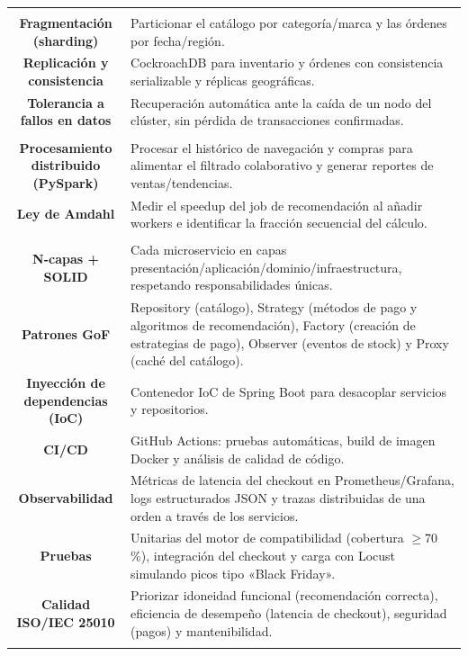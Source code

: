 \documentclass[11pt]{article}
\begin{document}
\begin{longtable}{C A}
\\
\textbf{Fragmentación (sharding)} & Particionar el catálogo por categoría/marca y las órdenes por fecha/región.\\
\textbf{Replicación y consistencia} & CockroachDB para inventario y órdenes con consistencia serializable y réplicas geográficas.\\
\textbf{Tolerancia a fallos en datos} & Recuperación automática ante la caída de un nodo del clúster, sin pérdida de transacciones confirmadas.\\
\addlinespace[1pt]
\\
\textbf{Procesamiento distribuido (PySpark)} & Procesar el histórico de navegación y compras para alimentar el filtrado colaborativo y generar reportes de ventas/tendencias.\\
\textbf{Ley de Amdahl} & Medir el speedup del job de recomendación al añadir workers e identificar la fracción secuencial del cálculo.\\
\addlinespace[1pt]
\\
\textbf{N-capas + SOLID} & Cada microservicio en capas presentación/aplicación/dominio/infraestructura, respetando responsabilidades únicas.\\
\textbf{Patrones GoF} & Repository (catálogo), Strategy (métodos de pago y algoritmos de recomendación), Factory (creación de estrategias de pago), Observer (eventos de stock) y Proxy (caché del catálogo).\\
\textbf{Inyección de dependencias (IoC)} & Contenedor IoC de Spring Boot para desacoplar servicios y repositorios.\\
\textbf{CI/CD} & GitHub Actions: pruebas automáticas, build de imagen Docker y análisis de calidad de código.\\
\textbf{Observabilidad} & Métricas de latencia del checkout en Prometheus/Grafana, logs estructurados JSON y trazas distribuidas de una orden a través de los servicios.\\
\textbf{Pruebas} & Unitarias del motor de compatibilidad (cobertura $\geq$70 \%), integración del checkout y carga con Locust simulando picos tipo «Black Friday».\\
\textbf{Calidad ISO/IEC 25010} & Priorizar idoneidad funcional (recomendación correcta), eficiencia de desempeño (latencia de checkout), seguridad (pagos) y mantenibilidad.\\
\addlinespace[1pt]
\end{longtable}
\end{document}
